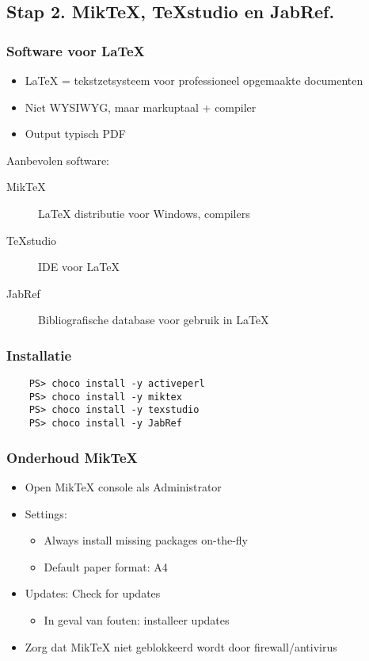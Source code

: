 \documentclass[aspectratio=169]{beamer}
\begin{document}
\subsection{Stap 2. MikTeX, TeXstudio en JabRef.}

\begin{frame}
  \frametitle{Software voor {\LaTeX}}

  \begin{itemize}
    \item {\LaTeX} = tekstzetsysteem voor professioneel opgemaakte documenten
    \item Niet WYSIWYG, maar markuptaal + compiler
    \item Output typisch PDF
  \end{itemize}

  \bigskip

  Aanbevolen software:

  \begin{description}
    \item[MikTeX] {\LaTeX} distributie voor Windows, compilers
    \item[TeXstudio]  IDE voor {\LaTeX}
    \item[JabRef] Bibliografische database voor gebruik in {\LaTeX}
  \end{description}

\end{frame}

\begin{frame}[fragile]
  \frametitle{Installatie}

  \begin{verbatim}
    PS> choco install -y activeperl
    PS> choco install -y miktex
    PS> choco install -y texstudio
    PS> choco install -y JabRef
  \end{verbatim}

\end{frame}

\begin{frame}
  \frametitle{Onderhoud Mik{\TeX}}

  \begin{itemize}
    \item Open Mik{\TeX} console als Administrator
    \item Settings:
      \begin{itemize}
        \item Always install missing packages on-the-fly
        \item Default paper format: A4
      \end{itemize}
    \item Updates: Check for updates
      \begin{itemize}
        \item In geval van fouten: installeer updates
      \end{itemize}
    \item Zorg dat Mik{\TeX} niet geblokkeerd wordt door firewall/antivirus
  \end{itemize}
\end{frame}
\end{document}
